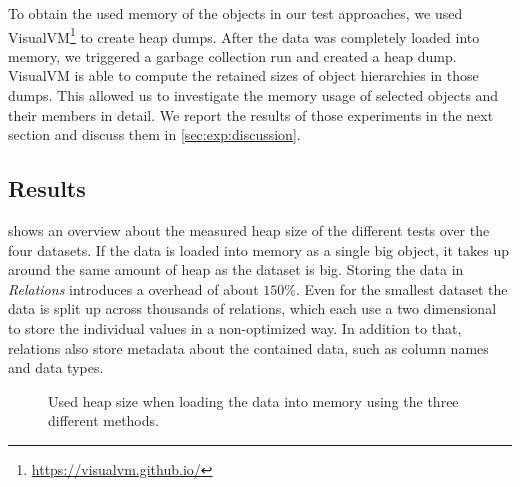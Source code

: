   To obtain the used memory of the objects in our test approaches, we used VisualVM\footnote{\url{https://visualvm.github.io/}} to create heap dumps.
  After the data was completely loaded into memory, we triggered a garbage collection run and created a heap dump.
  VisualVM is able to compute the retained sizes of object hierarchies in those dumps.
  This allowed us to investigate the memory usage of selected objects and their members in detail.
  We report the results of those experiments in the next section and discuss them in \cref{sec:exp:discussion}.

\subsection{Results}

   shows an overview about the measured heap size of the different tests over the four datasets.
  If the data is loaded into memory as a single big  object, it takes up around the same amount of heap as the dataset is big.
  Storing the data in \textit{Relations} introduces a overhead of about $150 \%$.
  Even for the smallest dataset the data is split up across thousands of relations, which each use a two dimensional  to store the individual values in a non-optimized way.
  In addition to that, relations also store metadata about the contained data, such as column names and data types.
  
  \begin{figure}
    \centering
    \caption{Used heap size when loading the data into memory using the three different methods.}
    \label{fig:exp:general}
  \end{figure}

